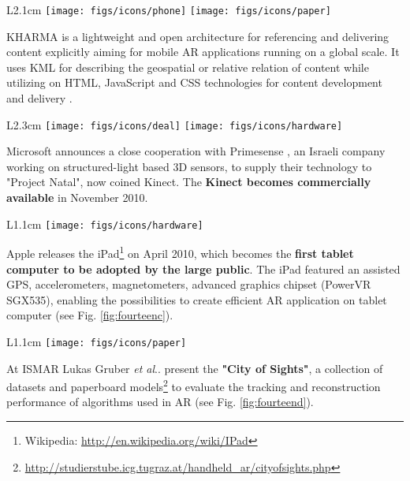 \documentclass[12pt,a4paper]{article}
\makeatletter
\DeclareRobustCommand\onedot{\futurelet\@let@token\@onedot}
\def\@onedot{\ifx\@let@token.\else.\null\fi\xspace}
\def\etal{\emph{et al}\onedot}
\makeatother
\begin{document}
\vspace{0.1in}

\begin{wrapfigure}{L}{2.1cm}
	\vspace{-15pt}	
	\texttt{[image: figs/icons/phone]}
	\texttt{[image: figs/icons/paper]}
	\vspace{-25pt}		
\end{wrapfigure} 
\noindent KHARMA is a lightweight and open architecture for referencing and delivering content explicitly aiming for mobile AR applications running on a global scale. It uses KML for describing the geospatial or relative relation of content while utilizing on HTML, JavaScript and CSS technologies for content development and delivery \cite{Hill10}.

\vspace{0.1in}

\begin{wrapfigure}{L}{2.3cm}
	\vspace{-15pt}	
	\texttt{[image: figs/icons/deal]}
	\texttt{[image: figs/icons/hardware]}
	\vspace{-31pt}		
\end{wrapfigure} 
\noindent Microsoft announces a close cooperation with Primesense , an Israeli company working on structured-light based 3D sensors, to supply their technology to "Project Natal", now coined Kinect. The \textbf{Kinect becomes commercially available} in November 2010.

\vspace{0.1in}

\begin{wrapfigure}{L}{1.1cm}
	\vspace{-15pt}	
	\texttt{[image: figs/icons/hardware]}
	\vspace{-15pt}		
\end{wrapfigure} 
\noindent Apple releases the iPad\footnote{Wikipedia: \url{http://en.wikipedia.org/wiki/IPad}} on April 2010, which becomes the \textbf{first tablet computer to be adopted by the large public}. The iPad featured an assisted GPS, accelerometers, magnetometers, advanced graphics chipset (PowerVR SGX535), enabling the possibilities to create efficient AR application on tablet computer (see Fig. \ref{fig:fourteenc}).

\vspace{0.1in}

\begin{wrapfigure}{L}{1.1cm}
	\vspace{-10pt}	
	\texttt{[image: figs/icons/paper]}
	\vspace{-0pt}		
\end{wrapfigure} 
\noindent At ISMAR Lukas Gruber \etal present the \textbf{"City of Sights"}, a collection of datasets and paperboard models\footnote{\url{http://studierstube.icg.tugraz.at/handheld_ar/cityofsights.php}} to evaluate the tracking and reconstruction performance of algorithms used in AR \cite{Gruber10} (see Fig. \ref{fig:fourteend}).
\end{document}
